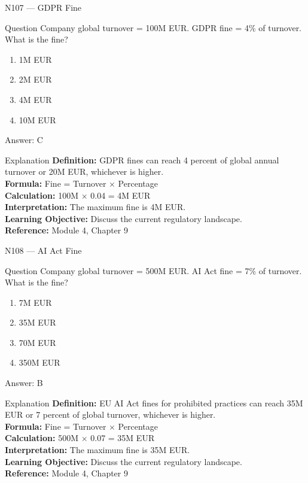 \documentclass[aspectratio=169,8pt]{beamer}
\begin{document}
	\begin{frame}{N107 --- GDPR Fine}
		\begin{block}{Question}
			Company global turnover = 100M EUR. GDPR fine = 4\% of turnover. What is the fine?
			\begin{enumerate}
				\item 1M EUR
				\item 2M EUR
				\item 4M EUR
				\item 10M EUR
			\end{enumerate}
		\end{block}
		\begin{exampleblock}{Answer: C}\end{exampleblock}
		\begin{block}{Explanation}
			\textbf{Definition:} GDPR fines can reach 4 percent of global annual turnover or 20M EUR, whichever is higher.\\
			\textbf{Formula:} Fine = Turnover $\times$ Percentage\\
			\textbf{Calculation:} 100M $\times$ 0.04 = 4M EUR\\
			\textbf{Interpretation:} The maximum fine is 4M EUR.\\
			\textbf{Learning Objective:} Discuss the current regulatory landscape.\\
			\textbf{Reference:} Module 4, Chapter 9
		\end{block}
	\end{frame}
	
	\begin{frame}{N108 --- AI Act Fine}
		\begin{block}{Question}
			Company global turnover = 500M EUR. AI Act fine = 7\% of turnover. What is the fine?
			\begin{enumerate}
				\item 7M EUR
				\item 35M EUR
				\item 70M EUR
				\item 350M EUR
			\end{enumerate}
		\end{block}
		\begin{exampleblock}{Answer: B}\end{exampleblock}
		\begin{block}{Explanation}
			\textbf{Definition:} EU AI Act fines for prohibited practices can reach 35M EUR or 7 percent of global turnover, whichever is higher.\\
			\textbf{Formula:} Fine = Turnover $\times$ Percentage\\
			\textbf{Calculation:} 500M $\times$ 0.07 = 35M EUR\\
			\textbf{Interpretation:} The maximum fine is 35M EUR.\\
			\textbf{Learning Objective:} Discuss the current regulatory landscape.\\
			\textbf{Reference:} Module 4, Chapter 9
		\end{block}
	\end{frame}
	
\end{document}
